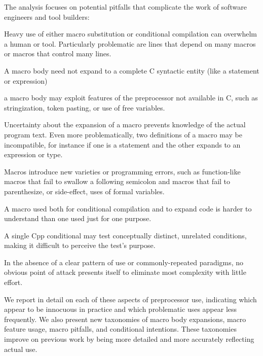 \documentclass[10pt]{article}
\begin{document}
The analysis focuses on potential pitfalls that complicate the work of
software engineers and tool builders:
\begin{description}\itemsep 0pt \parskip 0pt
\item[high total use]  Heavy use of either macro substitution or
  conditional compilation can overwhelm a human or tool.  Particularly
  problematic are lines that depend on many macros or macros that control
  many lines.
\item[complicated bodies]  A macro body need not expand to a complete
  C syntactic entity (like a statement or expression)
\item[extra-linguistic features]  a macro body may exploit features of
  the preprocessor not available in C, such as stringization, token
  pasting, or use of free variables.
\item[multiple definitions]  Uncertainty about the expansion of a macro
  prevents knowledge of the actual program text.  Even more problematically,
  two definitions of a macro may be incompatible, for instance if one is a
  statement and the other expands to an expression or type.
\item[macro pitfalls]  Macros introduce new varieties or programming
  errors, such as function-like macros that fail to swallow a following
  semicolon and macros that fail to parenthesize, or side-effect, uses of
  formal variables.
\item[inconsistent usage]  A macro used both for conditional compilation
  and to expand code is harder to understand than one used just for one
  purpose.
\item[mixed tests]  A single Cpp conditional may test conceptually
  distinct, unrelated conditions, making it difficult to perceive the
  test's purpose.
\item[variation in use]  In the absence of a clear pattern of use or
  commonly-repeated paradigms, no obvious point of attack presents itself
  to eliminate most complexity with little effort.
\end{description}

We report in detail on each of these aspects of preprocessor use,
indicating which appear to be innocuous in practice and which problematic
uses appear less frequently.  We also present new taxonomies of macro body
expansions, macro feature usage, macro pitfalls, and conditional
intentions.  These taxonomies improve on previous work by being more
detailed and more accurately reflecting actual use.
\end{document}

